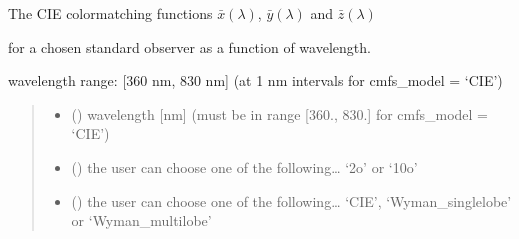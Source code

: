 \documentclass[letterpaper,10pt,english]{sphinxmanual}
\begin{document}
\begin{fulllineitems}
\label{\detokenize{07_colors:skinoptics.colors.cmfs}}
\pysigstartsignatures
{}
\pysigstopsignatures
\begin{DUlineblock}{0em}
\item[] The CIE color\sphinxhyphen{}matching functions \(\bar{x}(\lambda)\), \(\bar{y}(\lambda)\) and \(\bar{z}(\lambda)\) 
\item[] for a chosen standard observer as a function of wavelength.
\end{DUlineblock}

\begin{DUlineblock}{0em}
\item[] wavelength range: {[}360 nm, 830 nm{]} (at 1 nm intervals for cmfs\_model = ‘CIE’)
\end{DUlineblock}
\begin{quote}\begin{description}
\begin{itemize}
\item {} 
\sphinxAtStartPar
{} () \textendash{} wavelength {[}nm{]} (must be in range {[}360., 830.{]} for cmfs\_model = ‘CIE’)

\item {} 
\sphinxAtStartPar
{} () \textendash{} the user can choose one of the following… ‘2o’ or ‘10o’

\item {} 
\sphinxAtStartPar
{} (\sphinxstyleliteralemphasis{\sphinxupquote{ (}}\sphinxstyleliteralemphasis{\sphinxupquote{)}}) \textendash{} the user can choose one of the following… ‘CIE’, ‘Wyman\_singlelobe’ or ‘Wyman\_multilobe’

\end{itemize}


\end{description}
\end{quote}
\end{fulllineitems}
\end{document}
